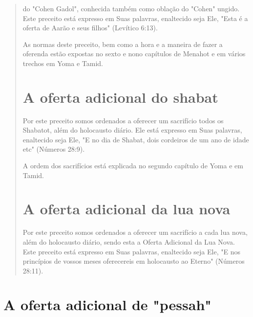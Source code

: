 \begin{quote}


do "Cohen Gadol", conhecida também como oblação do "Cohen" ungido. Este
preceito está expresso em Suas palavras, enaltecido seja Ele, "Esta é a
oferta de Aarão e seus filhos" (Levítico 6:13).

As normas deste preceito, bem como a hora e a maneira de fazer a
oferenda estão expostas no sexto e nono capítulos de Menahot e em vários
tre­chos em Yoma e Tamid.

\section{A oferta adicional do shabat}

Por este preceito somos ordenados a oferecer um sacrifício todos os
Shabatot, além do holocausto diário. Ele está expresso em Suas palavras,
enal­tecido seja Ele, "E no dia de Shabat, dois cordeiros de um ano de
idade etc" (Números 28:9).

A ordem dos sacrifícios está explicada no segundo capítulo de Yo­ma e em
Tamid.

\section{A oferta adicional da lua nova}

Por este preceito somos ordenados a oferecer um sacrifício a cada lua
nova, além do holocausto diário, sendo esta a Oferta Adicional da Lua
No­va. Este preceito está expresso em Suas palavras, enaltecido seja
Ele, "E nos princípios de vossos meses oferecereis em holocausto ao
Eterno" (Números 28:11).
\end{quote}

\section{A oferta adicional de "pessah"}

